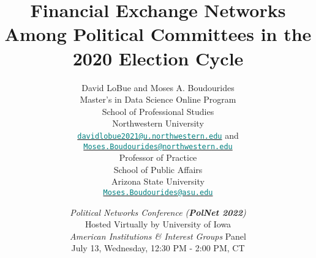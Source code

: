 \documentclass{beamer}
\newcommand\makebeamertitle{\frame{\maketitle}}%
\begin{document}
\newenvironment{tightcenter}{%
  \setlength\topsep{0pt}
  \setlength\parskip{0pt}
  \begin{center}
}{%
  \end{center}
}

\title[Financial Exchange Networks]{Financial Exchange Networks Among Political Committees in the 2020 Election Cycle}
\author[Lobue\&Boudourides]{{\color{blue}David LoBue\!\!  and Moses A. Boudourides\!\! }\\[2ex]
{ \scriptsize{Master's in Data Science Online Program\\
School of Professional Studies \\ 
Northwestern University\\%
{\href{mailto:davidlobue2021@u.northwestern.edu}{\texttt{\textcolor{teal}
{davidlobue2021@u.northwestern.edu}}}} and 
{\href{mailto:Moses.Boudourides@northwestern.edu}{\texttt{\textcolor{teal}{Moses.Boudourides@northwestern.edu}}}}\\[1ex]  
}}
{ \scriptsize{Professor of Practice\\ 
School of Public Affairs\\
Arizona State University\\%
\vspace{-1.5 mm}
{\href{mailto:Moses.Boudourides@asu.edu}{\texttt{\textcolor{teal}{Moses.Boudourides@asu.edu}}}}
\vspace{-7 mm}
}} 
 }
\date[PolNet] %
{{\it{Political Networks Conference ({\bf{PolNet 2022}})}}\\[0.2ex]
{\scriptsize{Hosted Virtually by University of Iowa}}\\[0.2ex]
{\small{{\it{American Institutions \& Interest Groups}} Panel}}\\[0.2ex] 
{July 13, Wednesday, 12:30 PM - 2:00 PM,  CT}}

\makebeamertitle
\end{document}
